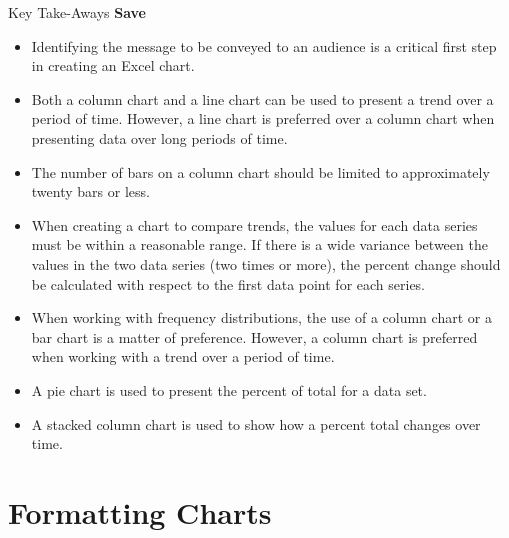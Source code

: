 \begin{center}
	\begin{tkwbox}{Key Take-Aways}
		\textbf{Save}
		\\
		\begin{itemize}
			\setlength{\itemsep}{0pt}
			\setlength{\parskip}{0pt}
			\setlength{\parsep}{0pt}
			
			\item Identifying the message to be conveyed to an audience is a critical first step in creating an Excel chart.
			\item Both a column chart and a line chart can be used to present a trend over a period of time. However, a line chart is preferred over a column chart when presenting data over long periods of time.
			\item The number of bars on a column chart should be limited to approximately twenty bars or less.
			\item When creating a chart to compare trends, the values for each data series must be within a reasonable range. If there is a wide variance between the values in the two data series (two times or more), the percent change should be calculated with respect to the first data point for each series.
			\item When working with frequency distributions, the use of a column chart or a bar chart is a matter of preference. However, a column chart is preferred when working with a trend over a period of time.
			\item A pie chart is used to present the percent of total for a data set.
			\item A stacked column chart is used to show how a percent total changes over time.

		\end{itemize}
	\end{tkwbox}
\end{center}

\section{Formatting Charts}

